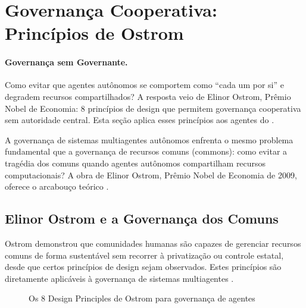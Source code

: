 \section{Governança Cooperativa: Princípios de Ostrom}
\label{sec:governanca-ostrom}
\nivelphd

\paragraph{Governança sem Governante.}
Como evitar que agentes autônomos se comportem como
``cada um por si'' e degradem recursos compartilhados?
A resposta veio de Elinor Ostrom, Prêmio Nobel de Economia:
8 princípios de design que permitem governança cooperativa
sem autoridade central. Esta seção aplica esses princípios
aos agentes do \opencodeeco{}.

A governança de sistemas multiagentes autônomos enfrenta o mesmo
problema fundamental que a governança de recursos comuns (commons):
como evitar a tragédia dos comuns quando agentes autônomos compartilham
recursos computacionais? A obra de Elinor Ostrom, Prêmio Nobel de
Economia de 2009, oferece o arcabouço teórico \cite{ostrom1990governing}.

\subsection{Elinor Ostrom e a Governança dos Comuns}

Ostrom demonstrou que comunidades humanas são capazes de gerenciar
recursos comuns de forma sustentável sem recorrer à privatização ou
controle estatal, desde que certos princípios de design sejam
observados. Estes princípios são diretamente aplicáveis à governança
de sistemas multiagentes \cite{ostrom1990governing, opencode2026spec036}.

\begin{figure}[htb]
\centering
\caption{Os 8 Design Principles de Ostrom para governança de agentes}
\label{fig:ostrom-dp}
\end{figure}

